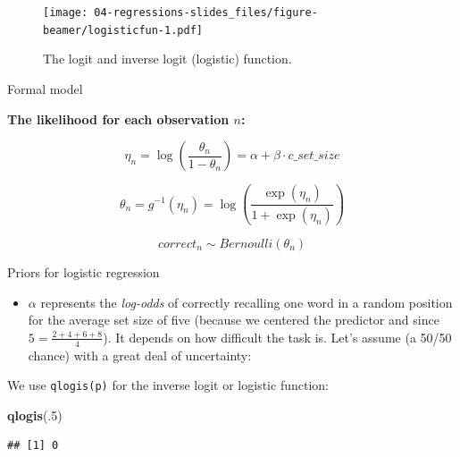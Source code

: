 \documentclass[12pt,ignorenonframetext,aspectratio=169]{beamer}
\newenvironment{Shaded}{\begin{snugshade}}{\end{snugshade}}
\newcommand{\DecValTok}[1]{\textcolor[rgb]{0.00,0.00,0.81}{#1}}
\newcommand{\KeywordTok}[1]{\textcolor[rgb]{0.13,0.29,0.53}{\textbf{#1}}}
\newcommand{\NormalTok}[1]{#1}
\providecommand{\tightlist}{%
  \setlength{\itemsep}{0pt}\setlength{\parskip}{0pt}}
\begin{document}
\begin{frame}

\small

\begin{figure}
\centering
\texttt{[image: 04-regressions-slides\_files/figure-beamer/logisticfun-1.pdf]}
\caption{\label{fig:logisticfun}The logit and inverse logit (logistic) function.}
\end{figure}

\normalsize

\end{frame}

\begin{frame}{Formal model}
\protect\hypertarget{formal-model-3}{}

\textbf{The likelihood for each observation \(n\):}

\begin{equation}
\eta_n = \log\left(\frac{\theta_n}{1-\theta_n}\right) = \alpha + \beta \cdot c\_set\_size
\end{equation}

\begin{equation}
\theta_n = g^{-1}(\eta_n) =  \log\left(\frac{\exp(\eta_n)}{1+\exp(\eta_n)}\right)
\end{equation}

\begin{equation}
correct_n \sim Bernoulli(\theta_n)
\label{eq:bernoullilogislik}
\end{equation}

\end{frame}

\begin{frame}[fragile]{Priors for logistic regression}
\protect\hypertarget{priors-for-logistic-regression}{}

\begin{itemize}
\tightlist
\item
  \(\alpha\) represents the \emph{log-odds} of correctly recalling one word in a random position for the average set size of five (because we centered the predictor and since \(5 = \frac{2+4+6+8}{4}\)). It depends on how difficult the task is. Let's assume (a 50/50 chance) with a great deal of uncertainty:
\end{itemize}

We use \texttt{qlogis(p)} for the inverse logit or logistic function:

\small

\begin{Shaded}
\begin{Highlighting}[]
\KeywordTok{qlogis}\NormalTok{(.}\DecValTok{5}\NormalTok{)}
\end{Highlighting}
\end{Shaded}

\begin{verbatim}
## [1] 0
\end{verbatim}

\normalsize

\end{frame}
\end{document}
